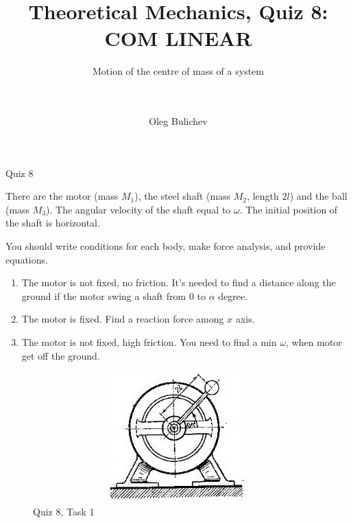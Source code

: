\documentclass[aspectratio=169,xcolor=table,10pt, notes=hide]{beamer}
\title[Theoretical Mechanics]{Theoretical Mechanics, Quiz 8: COM LINEAR} %
\subtitle{Motion of the centre of mass of a system \\ \  \\ \  } %
\author{Oleg Bulichev}
\newcommand{\fbckg}[1]{\usebackgroundtemplate{\texttt{[image: \#1]}}}%
\begin{document}
\setlength{\abovedisplayskip}{0pt}
\setlength{\belowdisplayskip}{0pt}
\setlength{\abovedisplayshortskip}{0pt}
\setlength{\belowdisplayshortskip}{0pt}

\fbckg{fibeamer/figs/title_page.png}

\note{}

\fbckg{fibeamer/figs/common.png}

\begin{frame}[t]{Quiz 8}
  \small
\begin{minipage}{0.6\textwidth}
  There are the motor (mass $M_1$), the steel shaft (mass $M_2$, length $2l$) and the ball (mass $M_3$). The angular velocity of the shaft equal to $\omega$.  The initial position of the shaft is horizontal.\smallskip

  You should write conditions for each body, make force analysis, and provide equations.
  \begin{enumerate}
      \item The motor is not fixed, no friction. It's needed to find a distance along the ground if the motor swing a shaft from $0$ to $\alpha$ degree.
      \item The motor is fixed. Find a reaction force among $x$ axis.
      \item The motor is not fixed, high friction. You need to find a min $\omega$, when motor get off the ground.
  \end{enumerate}
\end{minipage}
\begin{minipage}{0.39\textwidth}
  \begin{figure}[H]
    \centering\includegraphics[height=5cm,width=1\textwidth,keepaspectratio]{quiz8_1}
    \caption*{Quiz 8, Task 1}
  \end{figure}
\end{minipage}
\end{frame}
\end{document}
